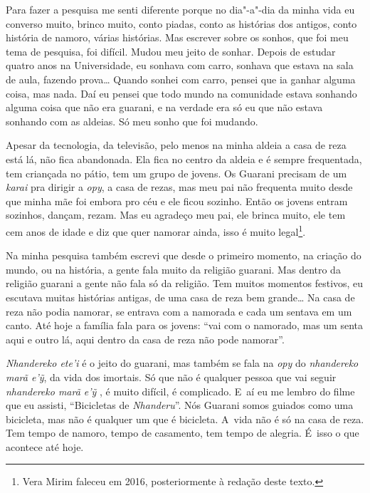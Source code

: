 Para fazer a pesquisa me senti diferente porque no dia"-a"-dia da minha
vida eu converso muito, brinco muito, conto piadas, conto as histórias
dos antigos, conto história de namoro, várias histórias. Mas escrever
sobre os sonhos, que foi meu tema de pesquisa, foi difícil. Mudou meu
jeito de sonhar. Depois de estudar quatro anos na Universidade, eu
sonhava com carro, sonhava que estava na sala de aula, fazendo prova\ldots{}
Quando sonhei com carro, pensei que ia ganhar alguma coisa, mas nada.
Daí eu pensei que todo mundo na comunidade estava sonhando alguma coisa
que não era guarani, e na verdade era só eu que não estava sonhando com
as aldeias. Só meu sonho que foi mudando.

Apesar da tecnologia, da televisão, pelo menos na minha aldeia a casa de
reza está lá, não fica abandonada. Ela fica no centro da aldeia e é
sempre frequentada, tem criançada no pátio, tem um grupo de jovens. Os
Guarani precisam de um \emph{karai} pra dirigir a \emph{opy}, a casa de rezas, mas
meu pai não frequenta muito desde que minha mãe foi embora pro céu e
ele ficou sozinho. Então os jovens entram sozinhos, dançam, rezam. Mas
eu agradeço meu pai, ele brinca muito, ele tem cem anos de idade e diz
que quer namorar ainda, isso é muito legal\footnote{Vera Mirim faleceu
em 2016, posteriormente à redação deste texto.}.

Na minha pesquisa também escrevi que desde o primeiro momento, na
criação do mundo, ou na história, a gente fala muito da religião
guarani. Mas dentro da religião guarani a gente não fala só da
religião. Tem muitos momentos festivos, eu escutava muitas histórias
antigas, de uma casa de reza bem grande\ldots{} Na casa de reza não podia
namorar, se entrava com a namorada e cada um sentava em um canto. Até
hoje a família fala para os jovens: ``vai com o namorado, mas um senta
aqui e outro lá, aqui dentro da casa de reza não pode namorar''.

\emph{Nhandereko ete’i} é o jeito do guarani, mas também se fala na \emph{opy} do
\emph{nhandereko marã e’ỹ}, da vida dos imortais. Só que não é qualquer
pessoa que vai seguir \emph{nhandereko marã e’ỹ} , é muito difícil, é
complicado. E~aí eu me lembro do filme que eu assisti, ``Bicicletas de
\emph{Nhanderu}''. Nós Guarani somos guiados como uma bicicleta, mas não é
qualquer um que é bicicleta. A~vida não é só na casa de reza. Tem tempo
de namoro, tempo de casamento, tem tempo de alegria. É~isso o que
acontece até hoje.

\clearpage

\vspace*{\fill}

